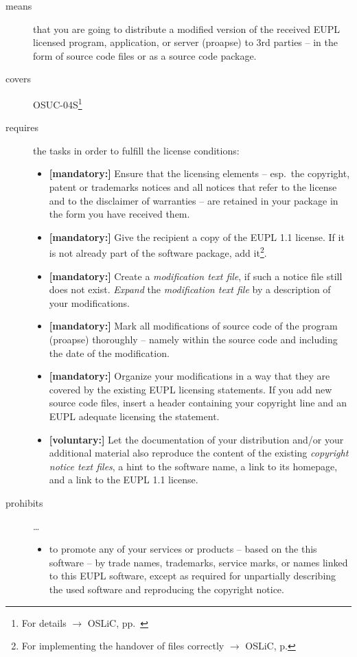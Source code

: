 \begin{description}
\item[means] that you are going to distribute a modified version of the received
EUPL licensed program, application, or server (proapse) to 3rd parties -- in the
form of source code files or as a source code package.
\item[covers] OSUC-04S\footnote{For details $\rightarrow$ OSLiC, pp.\
\pageref{OSUC-04S-DEF}}
\item[requires] the tasks in order to fulfill the license conditions:
\begin{itemize}
  
  \item \textbf{[mandatory:]} Ensure that the licensing elements -- esp.\ the
  copyright, patent or trademarks notices and all notices that refer to the
  license and to the disclaimer of warranties -- are retained in your package in
  the form you have received them.
  
  \item \textbf{[mandatory:]} Give the recipient a copy of the EUPL 1.1
  license. If it is not already part of the software package, add
  it\footnote{For implementing the handover of files correctly $\rightarrow$
  OSLiC, p. \pageref{DistributingFilesHint}}.

  \item \textbf{[mandatory:]} Create a \emph{modification text file}, if such a
  notice file still does not exist. \emph{Expand} the \emph{modification text
  file} by a description of your modifications.
    
  \item \textbf{[mandatory:]} Mark all modifications of source code of the
  program (proapse) thoroughly -- namely within the source code and including
  the date of the modification.
   
  \item \textbf{[mandatory:]} Organize your modifications in a way that they are
  covered by the existing EUPL licensing statements. If you add new source code
  files, insert a header containing your copyright line and an EUPL adequate
  licensing the statement.
   
  \item \textbf{[voluntary:]} Let the documentation of your distribution and/or
  your additional material also reproduce the content of the existing
  \emph{copyright notice text files}, a hint to the software name, a link to its
  homepage, and a link to the EUPL 1.1 license.
  
 \end{itemize}
 
\item[prohibits] \ldots
\begin{itemize}
  \item to promote any of your services or products -- based on the this software
  -- by trade names, trademarks, service marks, or names linked to this EUPL
  software, except as required for unpartially describing the used software and
  reproducing the copyright notice.
\end{itemize}

\end{description}

